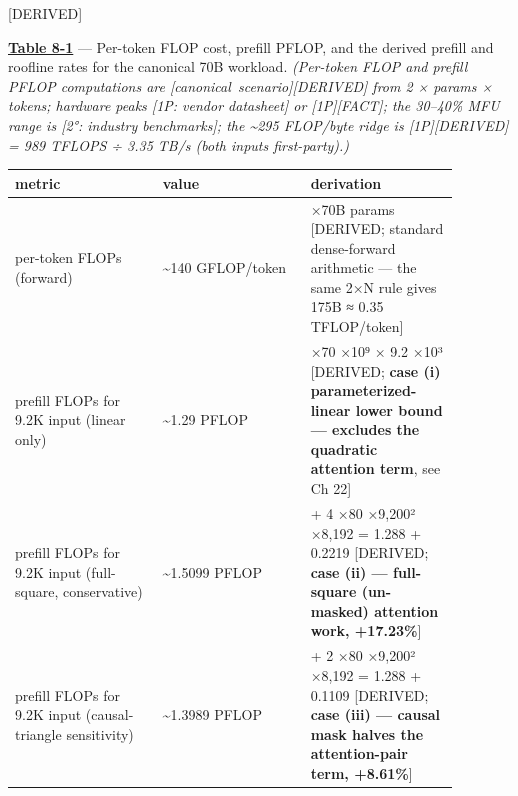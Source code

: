 \mbox{{[}DERIVED{]}}

\textbf{\hyperref[tab:8.1]{Table 8-1}} --- Per-token FLOP cost, prefill PFLOP, and the
derived prefill and roofline rates for the canonical 70B workload.
\emph{(Per-token FLOP and prefill PFLOP computations are \mbox{{[}canonical
scenario{]}}\hspace{0pt}\mbox{{[}DERIVED{]}} from 2 × params × tokens; hardware peaks {[}1P:
vendor datasheet{]} or \mbox{{[}1P{]}}\hspace{0pt}\mbox{{[}FACT{]}}; the 30--40\% MFU range is
{[}2°: industry benchmarks{]}; the \textasciitilde295 FLOP/byte ridge is
\mbox{{[}1P{]}}\hspace{0pt}\mbox{{[}DERIVED{]}} = 989 TFLOPS ÷ 3.35 TB/s (both inputs
first-party).)}

\nopagebreak[4]
\begin{longtable}[]{@{}
  >{\raggedright\arraybackslash}p{0.2927\linewidth}
  >{\raggedright\arraybackslash}p{0.2927\linewidth}
  >{\raggedright\arraybackslash}p{0.2927\linewidth}@{}}
\toprule\noalign{}
\begin{minipage}[b]{\linewidth}\raggedright
metric
\end{minipage} & \begin{minipage}[b]{\linewidth}\raggedright
value
\end{minipage} & \begin{minipage}[b]{\linewidth}\raggedright
derivation
\end{minipage} \\
\midrule\noalign{}
\endhead
\bottomrule\noalign{}
\endlastfoot
per-token FLOPs (forward) & \textasciitilde140 GFLOP/token & 2 ×70B
params {[}DERIVED; standard dense-forward arithmetic --- the same 2×N
rule gives 175B ≈ 0.35 TFLOP/token{]} \\
\noalign{\label{tab:8.1}}
prefill FLOPs for 9.2K input (linear only) & \textasciitilde1.29 PFLOP &
2 ×70 ×10⁹ × 9.2 ×10³ {[}DERIVED; \textbf{case (i) parameterized-linear
lower bound --- excludes the quadratic attention term}, see Ch 22{]} \\
prefill FLOPs for 9.2K input (full-square, conservative) &
\textasciitilde1.5099 PFLOP & 1.288 + 4 ×80 ×9,200² ×8,192 = 1.288 +
0.2219 {[}DERIVED; \textbf{case (ii) --- full-square (un-masked)
attention work, +17.23\%}{]} \\
prefill FLOPs for 9.2K input (causal-triangle sensitivity) &
\textasciitilde1.3989 PFLOP & 1.288 + 2 ×80 ×9,200² ×8,192 = 1.288 +
0.1109 {[}DERIVED; \textbf{case (iii) --- causal mask halves the
attention-pair term, +8.61\%}{]} \\

\end{longtable}
